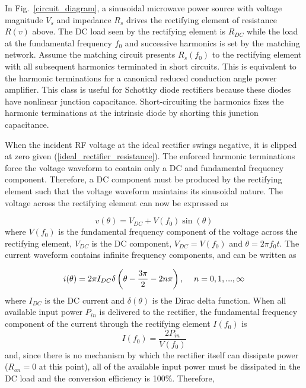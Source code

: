 In Fig.~\ref{circuit_diagram}, a sinusoidal microwave power source with voltage magnitude $V_s$ and impedance $R_s$ drives the rectifying element of resistance $R(v)$ above. The DC load seen by the rectifying element is $R_{DC}$ while the load at the fundamental frequency $f_0$ and successive harmonics is set by the matching network. Assume the matching circuit presents $R_s(f_0)$ to the rectifying element with all subsequent harmonics terminated in short circuits. This is equivalent to the harmonic terminations for a canonical reduced conduction angle power amplifier. This class is useful for Schottky diode rectifiers because these diodes have nonlinear junction capacitance. Short-circuiting the harmonics fixes the harmonic terminations at the intrinsic diode by shorting this junction capacitance.

When the incident RF voltage at the ideal rectifier swings negative, it is clipped at zero given (\ref{ideal_rectifier_resistance}).  The enforced harmonic terminations force the voltage waveform to contain only a DC and fundamental frequency component. Therefore, a DC component must be produced by the rectifying element such that the voltage waveform maintains its sinusoidal nature.  The voltage across the rectifying element can now be expressed as

\begin{equation}\label{diode_voltage_waveform_B}
    v(\theta) = V_{DC} + V(f_0)\sin(\theta)
\end{equation}
where $V(f_0)$ is the fundamental frequency component of the voltage across the rectifying element, $V_{DC}$ is the DC component, $V_{DC} = V(f_0)$ and $\theta = 2\pi f_0 t$. The current waveform contains infinite frequency components, and can be written as

\begin{equation}\label{diode_current_waveform_time_domain}
    i(\theta) = 2\pi I_{DC}\delta\left(\theta-\frac{3\pi}{2} - 2n\pi\right), \hskip 1pc n = 0,1,...,\infty
\end{equation}
where $I_{DC}$ is the DC current and $\delta(\theta)$ is the Dirac delta function. When all available input power $P_{in}$ is delivered to the rectifier, the fundamental frequency component of the current through the rectifying element $I(f_0)$ is
\begin{equation}\label{diode_current_waveform_finv_fo}
I(f_0) = \frac{2P_{in}}{V(f_0)}
\end{equation}
and, since there is no mechanism by which the rectifier itself can dissipate power ($R_{on}=0$ at this point), all of the available input power must be dissipated in the DC load and the conversion efficiency is 100\%. Therefore,

